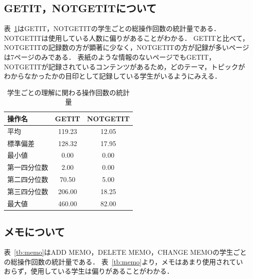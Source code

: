 \documentclass[a4paper,12pt]{ltjsreport}
\begin{document}
\subsection*{GETIT，NOTGETITについて}

表~\ref{tb:get}はGETIT，NOTGETITの学生ごとの総操作回数の統計量である．
NOTGETITは使用している人数に偏りがあることがわかる．
GETITと比べて，NOTGETITの記録数の方が顕著に少なく，NOTGETITの方が記録が多いページは7ページのみである．
表紙のような情報のないページでもGETIT，NOTGETITが記録されているコンテンツがあるため，どのテーマ，トピックがわからなかったかの目印として記録している学生がいるようにみえる．


\begin{table}[tbp]
  \centering
  \caption{学生ごとの理解に関わる操作回数の統計量}
  \label{tb:get}
  \begin{tabular}{l||c|c}
    操作名 & GETIT & NOTGETIT \\ \hline\hline
    平均 & 119.23 & 12.05 \\ \hline
    標準偏差 & 128.32 & 17.95 \\ \hline
    最小値 & 0.00 & 0.00 \\ \hline
    第一四分位数 & 2.00 & 0.00 \\ \hline
    第二四分位数 & 70.50 & 5.00 \\ \hline
    第三四分位数 & 206.00 & 18.25 \\ \hline
    最大値 & 460.00 & 82.00 \\ \hline
  \end{tabular}
\end{table}

\subsection*{メモについて}

表~\ref{tb:memo}はADD MEMO，DELETE MEMO，CHANGE MEMOの学生ごとの総操作回数の統計量である．
表~\ref{tb:memo}より，メモはあまり使用されていおらず，使用している学生は偏りがあることがわかる．
\end{document}
